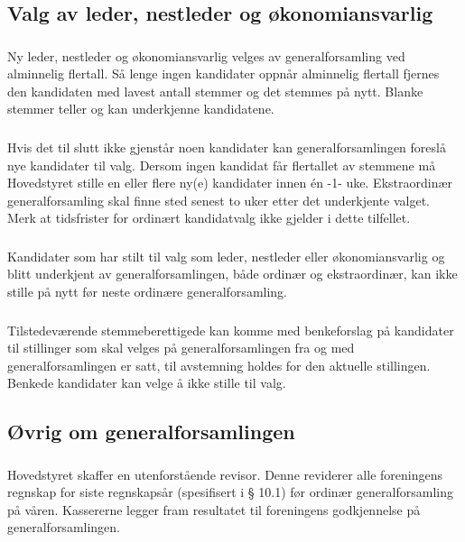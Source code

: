 \subsection{Valg av leder, nestleder og økonomiansvarlig}
\subsubsection{}
Ny leder, nestleder og økonomiansvarlig velges av generalforsamling ved
alminnelig flertall. Så lenge ingen kandidater oppnår alminnelig flertall
fjernes den kandidaten med lavest antall stemmer og det stemmes på nytt. Blanke
stemmer teller og kan underkjenne kandidatene.

\subsubsection{}
Hvis det til slutt ikke gjenstår noen kandidater kan generalforsamlingen
foreslå nye kandidater til valg. Dersom ingen
kandidat får flertallet av stemmene må Hovedstyret stille en eller flere ny(e)
kandidater innen én -1- uke. Ekstraordinær generalforsamling skal finne sted
senest to uker etter det underkjente valget. Merk at tidsfrister for ordinært
kandidatvalg ikke gjelder i dette tilfellet.

\subsubsection{}
Kandidater som har stilt til valg som leder, nestleder eller økonomiansvarlig
og blitt underkjent av generalforsamlingen, både ordinær og ekstraordinær, kan
ikke stille på nytt før neste ordinære generalforsamling.

\subsubsection{}
Tilstedeværende stemmeberettigede kan komme med benkeforslag på kandidater til
stillinger som skal velges på generalforsamlingen fra og med
generalforsamlingen er satt, til avstemning holdes for den aktuelle stillingen.
Benkede kandidater kan velge å ikke stille til valg.

\subsection{Øvrig om generalforsamlingen}
\subsubsection{}
Hovedstyret skaffer en utenforstående revisor. Denne reviderer alle foreningens
regnskap for siste regnskapsår (spesifisert i § 10.1) før ordinær
generalforsamling på våren.  Kassererne legger fram resultatet til foreningens
godkjennelse på generalforsamlingen.

